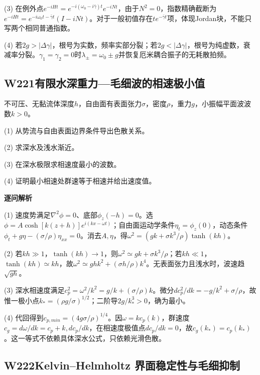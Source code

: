 (3) 在例外点$e^{-iHt}=e^{-i(\omega_0-i\bar\gamma)t}e^{-iNt}$，由于$N^2=0$，指数精确截断为$e^{-iHt}=e^{-i\omega_0t-\bar\gamma t}(I-iNt)$。对于一般初值存在$t e^{-\bar\gamma t}$项，体现Jordan块，不能只写两个相同普通指数。

(4) 若$2g>|\Delta\gamma|$，根号为实数，频率实部分裂；若$2g<|\Delta\gamma|$，根号为纯虚数，衰减率分裂。$\gamma_1=\gamma_2=0$时$\lambda_\pm=\omega_0\pm g$并恢复厄米耦合振子的无耗散拍频。

\par\medskip

\subsection*{W221\quad 有限水深重力—毛细波的相速极小值}

不可压、无黏流体深度$h$，自由面有表面张力$\sigma$，密度$\rho$，重力$g$，小振幅平面波波数$k>0$。

(1) 从势流与自由表面边界条件导出色散关系。

(2) 求深水及浅水渐近。

(3) 在深水极限求相速度最小的波数。

(4) 证明最小相速处群速等于相速并给出速度值。

\par\textbf{逐问解析}

(1) 速度势满足$\nabla^2\phi=0$、底部$\phi_z(-h)=0$。选$\phi=A\cosh[k(z+h)]e^{i(kx-\omega t)}$；自由面运动学条件$\eta_t=\phi_z(0)$，动态条件$\phi_t+g\eta-(\sigma/\rho)\eta_{xx}=0$。消去$A,\eta$，得$\omega^2=(gk+\sigma k^3/\rho)\tanh(kh)$。

(2) 若$kh\gg1$，$\tanh(kh)\to1$，则$\omega^2\simeq gk+\sigma k^3/\rho$；若$kh\ll1$，$\tanh(kh)\simeq kh$，故$\omega^2\simeq ghk^2+(\sigma h/\rho)k^4$。无表面张力且浅水时，波速趋$\sqrt{gh}$。

(3) 深水相速度满足$c_p^2=\omega^2/k^2=g/k+(\sigma/\rho)k$。微分$dc_p^2/dk=-g/k^2+\sigma/\rho$，故惟一极小点$k_*=(\rho g/\sigma)^{1/2}$；二阶导$2g/k_*^3>0$，确为最小。

(4) 代回得到$c_{p,min}=(4g\sigma/\rho)^{1/4}$。因$\omega=kc_p(k)$，群速度$c_g=d\omega/dk=c_p+k,dc_p/dk$，在相速度极值点$dc_p/dk=0$，故$c_g(k_*)=c_p(k_*)$。这一等式不依赖具体深水公式，只依赖光滑色散。

\par\medskip

\subsection*{W222\quad Kelvin–Helmholtz 界面稳定性与毛细抑制}

